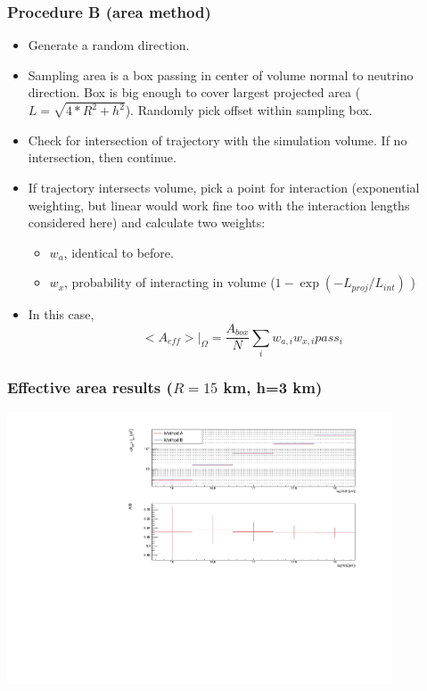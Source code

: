 \documentclass[hyperref={pdfpagelabels=false},aspectratio=169]{beamer} \mode<presentation> { \usetheme{Boadilla} }
\begin{document}
\begin{frame}
\frametitle{Procedure B (area method)} 
\begin{itemize}
\item Generate a random direction. 
\item Sampling area is a box  passing in center of volume normal to neutrino direction. Box is big enough to cover largest projected area ($L= \sqrt{4*R^2+h^2}$). Randomly pick offset within sampling box.
\item Check for intersection of trajectory with the simulation volume. If no intersection, then continue. 
\item If trajectory intersects volume, pick a point for interaction (exponential weighting, but linear would work fine too with the interaction lengths considered here) and calculate two weights: 
\begin{itemize}
  \item $w_a$, identical to before.
  \item $w_x$, probability of interacting in volume ($1-\exp(-L_{proj}/L_{int})$ ) 
\end{itemize} 
\item In this case, 
\begin{equation}
  <A_{eff}> |_{\Omega}  = \frac{A_{box}}{N} \sum_i w_{a,i} w_{x,i} pass_i
\end{equation} 
\end{itemize} 
\end{frame}

\begin{frame}
  \frametitle{Effective area results ($R=15$ km, h=3 km)} 
  \centering
  \includegraphics[width=4.5in]{result}

\end{frame} 
\end{document}

